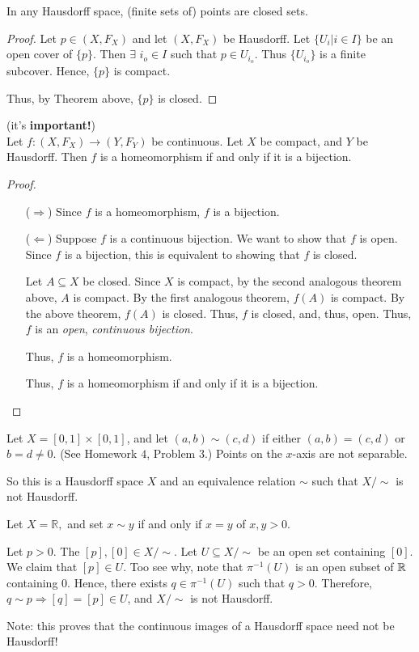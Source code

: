 \begin{corollary}
	In any Hausdorff space, (finite sets of) points are closed sets. 
\end{corollary}
\begin{proof}
	Let $p \in (X, F_X)$ and let $(X, F_X)$ be Hausdorff. Let $\{ U_i|i \in I\}$ be an open cover of $\{ p\}$. Then $\exists$ $i_o \in I$ such that $p \in U_{i_o}$. Thus $\{ U_{i_o} \}$ is a finite subcover. Hence, $\{ p \}$ is compact.
	
	Thus, by Theorem above, $\{ p\}$ is closed. 
\end{proof}
\begin{lemma}
	(it's {\bf important!})\\
	Let $f : (X, F_X) \to (Y, F_Y)$ be continuous. Let $X$ be compact, and $Y$ be Hausdorff. Then $f$ is a homeomorphism if and only if it is a bijection. 
\end{lemma}
\begin{proof}
	\begin{itemize}
		\item[($\Rightarrow$)] Since $f$ is a homeomorphism, $f$ is a bijection. 
		\item[($\Leftarrow$)] Suppose $f$ is a continuous bijection. We want to show that $f$ is open. Since $f$ is a bijection, this is equivalent to showing that $f$ is closed.
		
		Let $A \subseteq X$ be closed. Since $X$ is compact, by the second analogous theorem above, $A$ is compact. By the first analogous theorem, $f(A)$ is compact. By the above theorem, $f(A)$ is closed. Thus, $f$ is closed, and, thus, open. Thus, $f$ is an \emph{open}, \emph{continuous bijection}.
		
		Thus, $f$ is a homeomorphism.
		
		Thus, $f$ is a homeomorphism if and only if it is a bijection. 
	\end{itemize}
\end{proof}
\begin{example}
	Let $X=[0,1]\times[0,1]$, and let $(a,b)\sim(c,d)$ if either $(a,b)=(c,d)$ or $b=d\neq 0.$ (See Homework $4$, Problem $3$.) Points on the $x$-axis are not separable.
	
	\placeholder So this is a Hausdorff space $X$ and an equivalence relation $\sim$ such that $X/\sim$ is not Hausdorff. 
\end{example}
\begin{example}
	Let $X=\mathbb{R},$ and set $x \sim y$ if and only if $x=y$ of $x,y>0.$ 
	
	\placeholder
	
	Let $p>0.$ The $[p],[0]\in X/\sim$. Let $U \subseteq X/\sim$ be an open set containing $[0].$ We claim that $[p]\in U$. Too see why, note that $\pi^{-1}(U)$ is an open subset of $\mathbb R$ containing $0$. Hence, there exists $q \in \pi^{-1}(U)$ such that $q>0.$ Therefore, $q \sim p \Rightarrow [q]=[p]\in U$, and $X/\sim$ is not Hausdorff. 
\end{example}

Note: this proves that the continuous images of a Hausdorff space need not be Hausdorff!
